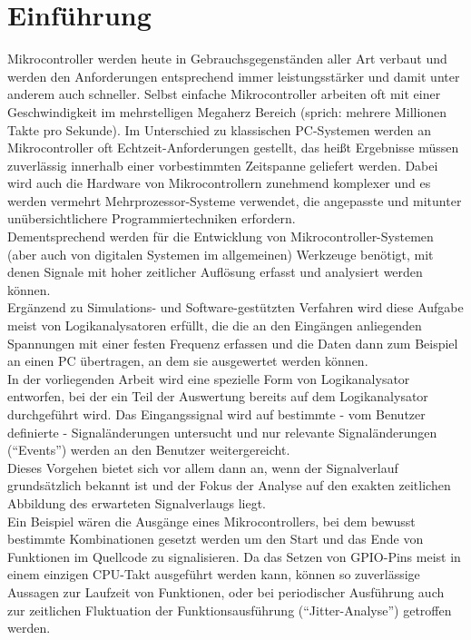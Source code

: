 \chapter{Einführung}

\label{ch:Einfuehrung}

Mikrocontroller werden heute in Gebrauchsgegenständen aller Art verbaut und werden den Anforderungen entsprechend immer leistungsstärker und damit unter anderem auch schneller. Selbst einfache Mikrocontroller arbeiten oft mit einer Geschwindigkeit im mehrstelligen Megaherz Bereich (sprich: mehrere Millionen Takte pro Sekunde). Im Unterschied zu klassischen PC-Systemen werden an Mikrocontroller oft Echtzeit-Anforderungen gestellt, das heißt Ergebnisse müssen zuverlässig innerhalb einer vorbestimmten Zeitspanne geliefert werden\cite{wiki:echtzeit}. Dabei wird auch die Hardware von Mikrocontrollern zunehmend komplexer und es werden vermehrt Mehrprozessor-Systeme verwendet, die angepasste und mitunter unübersichtlichere Programmiertechniken erfordern.\\ 
Dementsprechend werden für die Entwicklung von Mikrocontroller-Systemen (aber auch von digitalen Systemen im allgemeinen) Werkzeuge benötigt, mit denen Signale mit hoher zeitlicher Auflösung erfasst und analysiert werden können.\\
Ergänzend zu Simulations- und Software-gestützten Verfahren wird diese Aufgabe meist von Logikanalysatoren erfüllt, die die an den Eingängen anliegenden Spannungen mit einer festen Frequenz erfassen und die Daten dann zum Beispiel an einen PC übertragen, an dem sie ausgewertet werden können.\\
In der vorliegenden Arbeit wird eine spezielle Form von Logikanalysator entworfen, bei der ein Teil der Auswertung bereits auf dem Logikanalysator durchgeführt wird. Das Eingangssignal wird auf bestimmte - vom Benutzer definierte - Signaländerungen untersucht und nur relevante Signaländerungen (``Events'') werden an den Benutzer weitergereicht.\\
Dieses Vorgehen bietet sich vor allem dann an, wenn der Signalverlauf grundsätzlich bekannt ist und der Fokus der Analyse auf den exakten zeitlichen Abbildung des erwarteten Signalverlaugs liegt.\\
Ein Beispiel wären die Ausgänge eines Mikrocontrollers, bei dem bewusst bestimmte Kombinationen gesetzt werden um den Start und das Ende von Funktionen im Quellcode zu signalisieren. Da das Setzen von GPIO-Pins meist in einem einzigen CPU-Takt ausgeführt werden kann, können so zuverlässige Aussagen zur Laufzeit von Funktionen, oder bei periodischer Ausführung auch zur zeitlichen Fluktuation der Funktionsausführung (``Jitter-Analyse'') getroffen werden.

